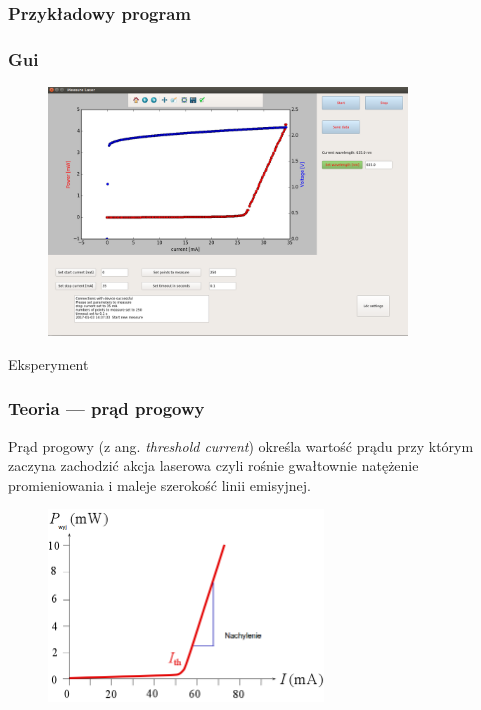 \documentclass[xcolor={dvipsnames,table}]{beamer}
\begin{document}
\begin{frame}
\frametitle{Przykładowy program}

\end{frame}

\begin{frame}
\frametitle{Gui}
\begin{figure}
   \includegraphics[width=0.85\textwidth,natwidth=69,natheight=87]{gui.png}
\end{figure}
\end{frame}

\begin{frame}
\begin{Huge}
\begin{center}
Eksperyment
\end{center}
\end{Huge}
\end{frame}

\begin{frame}
\frametitle{Teoria --- prąd progowy}
Prąd progowy (z ang. \textit{threshold current}) określa wartość prądu przy którym zaczyna zachodzić akcja laserowa czyli rośnie gwałtownie natężenie promieniowania i maleje szerokość linii emisyjnej.
\begin{figure}
   \includegraphics[width=0.65\textwidth,natwidth=69,natheight=87]{slope.png}
\end{figure}
\end{frame}
\end{document}

